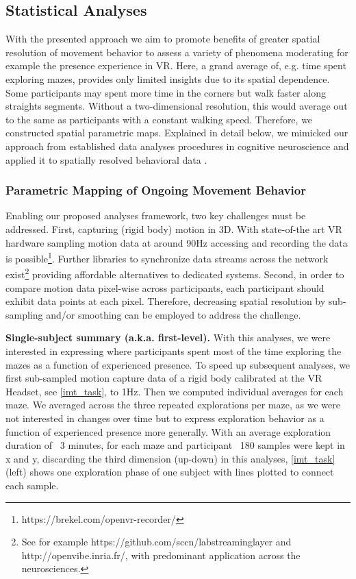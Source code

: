 \subsection{Statistical Analyses}
With the presented approach we aim to promote benefits of greater spatial resolution of movement behavior to assess a variety of phenomena moderating for example the presence experience in VR. Here, a grand average of, e.g. time spent exploring mazes, provides only limited insights due to its spatial dependence. Some participants may spent more time in the corners but walk faster along straights segments. Without a two-dimensional resolution, this would average out to the same as participants with a constant walking speed. Therefore, we constructed spatial parametric maps. Explained in detail below, we mimicked our approach from established data analyses procedures in cognitive neuroscience and applied it to spatially resolved behavioral data \cite{Friston1994, Bridwell2018a}.

\subsubsection{Parametric Mapping of Ongoing Movement Behavior}
Enabling our proposed analyses framework, two key challenges must be addressed. First, capturing (rigid body) motion in 3D. With state-of-the art VR hardware sampling motion data at around 90Hz accessing and recording the data is possible\footnote{https://brekel.com/openvr-recorder/}. Further libraries to synchronize data streams across the network exist\footnote{See for example https://github.com/sccn/labstreaminglayer and http://openvibe.inria.fr/, with predominant application across the neurosciences.} providing affordable alternatives to dedicated systems.
Second, in order to compare motion data pixel-wise across participants, each participant should exhibit data points at each pixel. Therefore, decreasing spatial resolution by sub-sampling and/or smoothing can be employed to address the challenge.

\textbf{Single-subject summary (a.k.a. first-level).} With this analyses, we were interested in expressing where participants spent most of the time exploring the mazes as a function of experienced presence. To speed up subsequent analyses, we first sub-sampled motion capture data of a rigid body calibrated at the VR Headset, see \ref{imt_task}, to 1Hz. Then we computed individual averages for each maze. We averaged across the three repeated explorations per maze, as we were not interested in changes over time but to express exploration behavior as a function of experienced presence more generally. With an average exploration duration of ~3 minutes, for each maze and participant ~180 samples were kept in x and y, discarding the third dimension (up-down) in this analyses, \ref{imt_task} (left) shows one exploration phase of one subject with lines plotted to connect each sample. 

